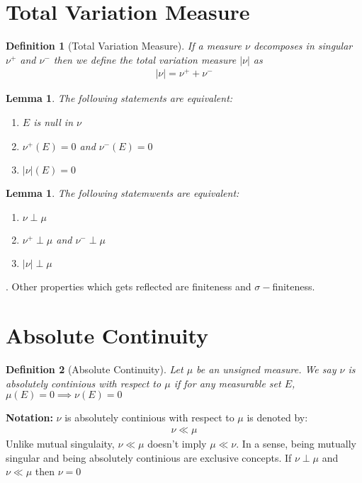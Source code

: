 \documentclass[notoc]{tufte-book}
\newtheorem{defn}{Definition}
\newtheorem{lemma}[theorem]{Lemma}
\begin{document}
\section{Total Variation Measure}
\begin{defn}[Total Variation Measure]
	If a measure $\nu$ decomposes in singular $\nu^+$ and $\nu^-$ then we define the total variation measure $|\nu|$ as
	\begin{align}
		|\nu|=\nu^++\nu^-
	\end{align}
\end{defn}
\begin{lemma}
	The following statements are equivalent:
	\begin{enumerate}
		\item $E$ is null in $\nu$
		\item $\nu^+(E)=0$ and $\nu^-(E)=0$
		\item $|\nu|(E)=0$
	\end{enumerate}
\end{lemma}

\begin{lemma}
	The following statemwents are equivalent:
	\begin{enumerate}
		\item $\nu\perp\mu$
		\item $\nu^+\perp\mu$ and $\nu^-\perp\mu$
		\item $|\nu|\perp\mu$
	\end{enumerate}
\end{lemma}
. Other properties which gets reflected are finiteness and $\sigma-$finiteness.
\section{Absolute Continuity}
\begin{defn}[Absolute Continuity]
Let $\mu$ be an unsigned measure. We say $\nu$ is absolutely continious with respect to $\mu$ if for any measurable set $E$, $\mu(E)=0\implies \nu(E)=0$
\end{defn}
\noindent\textbf{Notation:} $\nu$ is absolutely continious with respect to $\mu$ is denoted by:
\begin{align*}
	\nu\ll\mu
\end{align*}
Unlike mutual singulaity, $\nu\ll\mu$ doesn't imply $\mu\ll\nu$. In a sense, being mutually singular and being absolutely continious are exclusive concepts. If $\nu\perp\mu$ and $\nu\ll\mu$ then $\nu=0$
\end{document}
